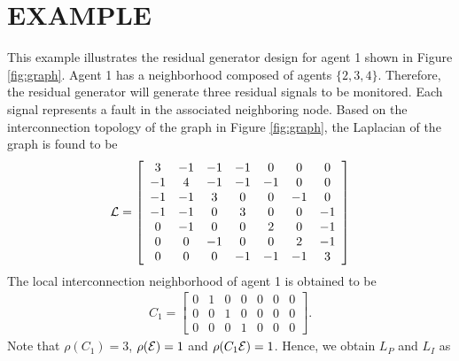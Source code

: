 \documentclass[letterpaper, 11 pt, conference]{ieeeconf}  %
\begin{document}
\section{EXAMPLE} \label{sec:ex}
This example illustrates the residual generator design for agent 1 shown in Figure \ref{fig:graph}. Agent 1 has a neighborhood composed of agents $\{2,3,4\}$. Therefore, the residual generator will generate three residual signals to be monitored. Each signal represents a fault in the associated neighboring node. Based on the interconnection topology of the graph in Figure \ref{fig:graph}, the Laplacian of the graph is found to be
\begin{align*}
\mathcal{L} = \left [\begin{array}{ccccccc} 
	3&-1&-1&-1&0&0&0\\
    -1&4&-1&-1&-1&0&0\\
    -1&-1&3&0&0&-1&0\\
    -1&-1&0&3&0&0&-1\\
     0&-1&0&0&2&0&-1\\
     0&0&-1&0&0&2&-1\\
     0&0&0&-1&-1&-1&3 \end{array} \right ]
\end{align*}
The local interconnection neighborhood of agent 1 is obtained to be
\begin{align*}
C_1 = \left [ \begin{array}{ccccccc} 
     0&1&0&0&0&0&0\\
     0&0&1&0&0&0&0\\
     0&0&0&1&0&0&0 \end{array} \right ].
\end{align*}
Note that $\rho(C_1) = 3$, $\rho(\mathcal{E}) = 1$ and $\rho(C_1\mathcal{E}) = 1$. Hence, we obtain $L_P$ and $L_I$ as
\end{document}
